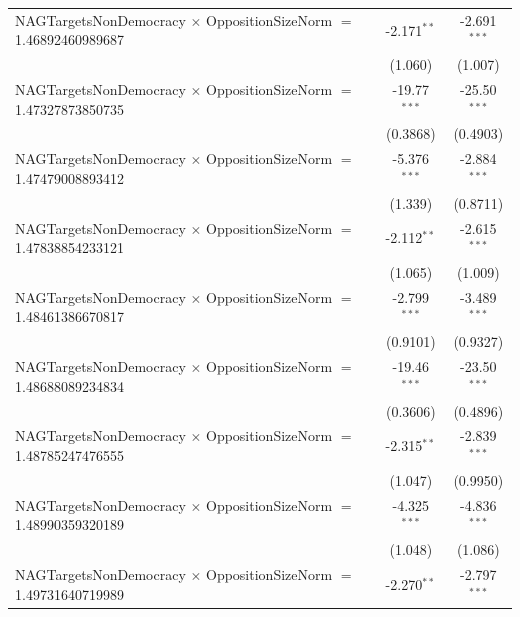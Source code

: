 \begin{tabular}{lcc}
   NAGTargetsNonDemocracy $\times$ OppositionSizeNorm $=$ 1.46892460989687      & -2.171$^{**}$        & -2.691$^{***}$\\   
                                                                                & (1.060)              & (1.007)\\   
   NAGTargetsNonDemocracy $\times$ OppositionSizeNorm $=$ 1.47327873850735      & -19.77$^{***}$       & -25.50$^{***}$\\   
                                                                                & (0.3868)             & (0.4903)\\   
   NAGTargetsNonDemocracy $\times$ OppositionSizeNorm $=$ 1.47479008893412      & -5.376$^{***}$       & -2.884$^{***}$\\   
                                                                                & (1.339)              & (0.8711)\\   
   NAGTargetsNonDemocracy $\times$ OppositionSizeNorm $=$ 1.47838854233121      & -2.112$^{**}$        & -2.615$^{***}$\\   
                                                                                & (1.065)              & (1.009)\\   
   NAGTargetsNonDemocracy $\times$ OppositionSizeNorm $=$ 1.48461386670817      & -2.799$^{***}$       & -3.489$^{***}$\\   
                                                                                & (0.9101)             & (0.9327)\\   
   NAGTargetsNonDemocracy $\times$ OppositionSizeNorm $=$ 1.48688089234834      & -19.46$^{***}$       & -23.50$^{***}$\\   
                                                                                & (0.3606)             & (0.4896)\\   
   NAGTargetsNonDemocracy $\times$ OppositionSizeNorm $=$ 1.48785247476555      & -2.315$^{**}$        & -2.839$^{***}$\\   
                                                                                & (1.047)              & (0.9950)\\   
   NAGTargetsNonDemocracy $\times$ OppositionSizeNorm $=$ 1.48990359320189      & -4.325$^{***}$       & -4.836$^{***}$\\   
                                                                                & (1.048)              & (1.086)\\   
   NAGTargetsNonDemocracy $\times$ OppositionSizeNorm $=$ 1.49731640719989      & -2.270$^{**}$        & -2.797$^{***}$\\   

\end{tabular}
